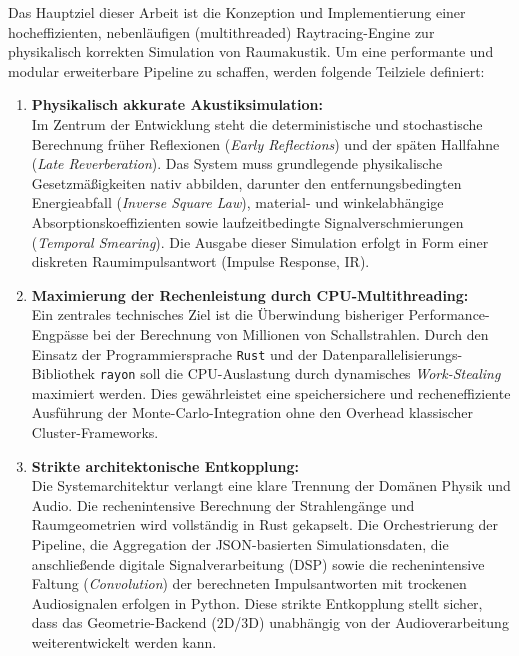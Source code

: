 Das Hauptziel dieser Arbeit ist die Konzeption und Implementierung einer hocheffizienten, nebenläufigen (multithreaded) Raytracing-Engine zur physikalisch korrekten Simulation von Raumakustik.
Um eine performante und modular erweiterbare Pipeline zu schaffen, werden folgende Teilziele definiert:

\begin{enumerate}
    \item \textbf{Physikalisch akkurate Akustiksimulation:}\\
    Im Zentrum der Entwicklung steht die deterministische und stochastische Berechnung früher Reflexionen (\textit{Early Reflections}) und der späten Hallfahne (\textit{Late Reverberation}).
    Das System muss grundlegende physikalische Gesetzmäßigkeiten nativ abbilden, darunter den entfernungsbedingten Energieabfall (\textit{Inverse Square Law}),
    material- und winkelabhängige Absorptionskoeffizienten sowie laufzeitbedingte Signalverschmierungen (\textit{Temporal Smearing}).
    Die Ausgabe dieser Simulation erfolgt in Form einer diskreten Raumimpulsantwort (Impulse Response, IR).

    \item \textbf{Maximierung der Rechenleistung durch CPU-Multithreading:}\\
    Ein zentrales technisches Ziel ist die Überwindung bisheriger Performance-Engpässe bei der Berechnung von Millionen von Schallstrahlen.
    Durch den Einsatz der Programmiersprache \texttt{Rust} und der Datenparallelisierungs-Bibliothek \texttt{rayon} soll die CPU-Auslastung durch dynamisches \textit{Work-Stealing} maximiert werden.
    Dies gewährleistet eine speichersichere und recheneffiziente Ausführung der Monte-Carlo-Integration ohne den Overhead klassischer Cluster-Frameworks.

    \item \textbf{Strikte architektonische Entkopplung:}\\
    Die Systemarchitektur verlangt eine klare Trennung der Domänen Physik und Audio.
    Die rechenintensive Berechnung der Strahlengänge und Raumgeometrien wird vollständig in Rust gekapselt.
    Die Orchestrierung der Pipeline, die Aggregation der JSON-basierten Simulationsdaten, die anschließende digitale Signalverarbeitung (DSP) sowie die rechenintensive Faltung
    (\textit{Convolution}) der berechneten Impulsantworten mit trockenen Audiosignalen erfolgen in Python.
    Diese strikte Entkopplung stellt sicher, dass das Geometrie-Backend (2D/3D) unabhängig von der Audioverarbeitung weiterentwickelt werden kann.
\end{enumerate}

